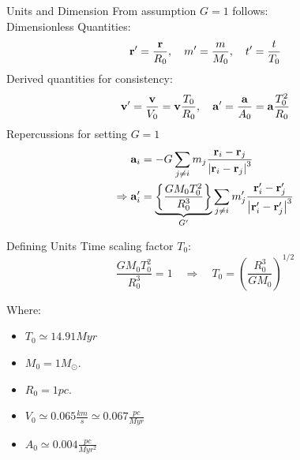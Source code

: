 \begin{frame}{Units and Dimension}
	From assumption $G=1$ follows: \\
	Dimensionless Quantities:
	\begin{equation}
		\vb{r}^{\prime}=\frac{\vb{r}}{R_0}, \quad m^{\prime}=\frac{m}{M_0}, \quad t^{\prime}=\frac{t}{T_0}
	\end{equation}
	Derived quantities for consistency:
	\begin{equation}
		\begin{aligned}
			\vb{v}^{\prime} = \frac{\vb{v}}{V_0} = \vb{v} \frac{T_0}{R_0}, \quad \vb{a}^{\prime} = \frac{\vb{a}}{A_0} = \vb{a} \frac{T_0^2}{R_0}
		\end{aligned}
	\end{equation}
	Repercussions for setting $G = 1$
	\begin{equation}
		\begin{aligned}
			\vb{a}_i                      & =-G \sum_{j\neq i} m_j \frac{\vb{r}_i-\vb{r}_j}{\left|\vb{r}_i-\vb{r}_j\right|^3} \\
			\Rightarrow \vb{a}_i^{\prime} & =\underbrace{\left\{\frac{G M_0
					T_0^2}{R_0^3}\right\}}_{G^{\prime}} \sum_{j\neq i} m_j^\prime
			\frac{\vb{r}_i^\prime-\vb{r}^\prime_j}{\left|\vb{r}^\prime_i-\vb{r}^\prime_j\right|^3}
		\end{aligned}
	\end{equation}
\end{frame}

\begin{frame}{Defining Units}
	Time scaling factor $T_0$:
	\begin{equation}
		\frac{G M_0 T_0^2}{R_0^3}=1 \quad \Rightarrow \quad T_0=\left(\frac{R_0^3}{G M_0}\right)^{1 / 2}
	\end{equation}\bigskip

	Where:
	\begin{itemize}
		\item $T_0 \simeq 14.91 Myr$
		\item $M_0 =  1 M_\odot$.
		\item $R_0 =  1 pc$.
		\item $V_0 \simeq 0.065 \frac{km}{s} \simeq 0.067 \frac{pc}{Myr}$
		\item $A_0 \simeq 0.004 \frac{pc}{Myr^2}$
	\end{itemize}
\end{frame}
